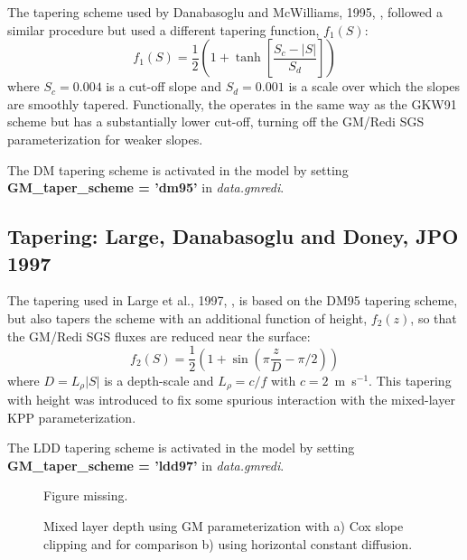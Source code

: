 The tapering scheme used by Danabasoglu and McWilliams, 1995,
\cite{dm:95}, followed a similar procedure but used a different
tapering function, $f_1(S)$:
\begin{equation}
f_1(S) = \frac{1}{2} \left( 1+\tanh \left[ \frac{S_c - |S|}{S_d} \right] \right)
\end{equation}
where $S_c = 0.004$ is a cut-off slope and $S_d=0.001$ is a scale over
which the slopes are smoothly tapered. Functionally, the operates in
the same way as the GKW91 scheme but has a substantially lower
cut-off, turning off the GM/Redi SGS parameterization for weaker
slopes.

The DM tapering scheme is activated in the model by setting {\bf
GM\_tap\-er\_scheme = 'dm95'} in {\em data.gmredi}.

\subsection{Tapering: Large, Danabasoglu and Doney, JPO 1997}

The tapering used in Large et al., 1997, \cite{ldd:97}, is based on the
DM95 tapering scheme, but also tapers the scheme with an additional
function of height, $f_2(z)$, so that the GM/Redi SGS fluxes are
reduced near the surface:
\begin{equation}
f_2(S) = \frac{1}{2} \left( 1 + \sin(\pi \frac{z}{D} - \pi/2)\right)
\end{equation}
where $D = L_\rho |S|$ is a depth-scale and $L_\rho=c/f$ with
$c=2$~m~s$^{-1}$.  This tapering with height was introduced to fix
some spurious interaction with the mixed-layer KPP parameterization.

The LDD tapering scheme is activated in the model by setting {\bf
GM\_tap\-er\_scheme = 'ldd97'} in {\em data.gmredi}.




\begin{figure}
\begin{center}
Figure missing.
\end{center}
\caption{Mixed layer depth using GM parameterization with a) Cox slope
clipping and for comparison b) using horizontal constant diffusion.}
\label{fig-mixedlayer}
\end{figure}





